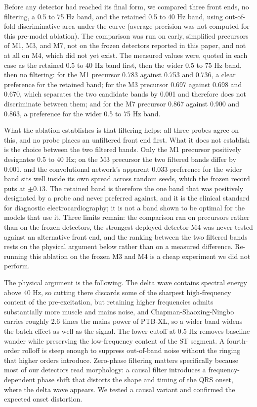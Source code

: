\documentclass[11pt]{article}
\begin{document}
Before any detector had reached its final form, we compared three front ends, no filtering, a 0.5 to 75 Hz band, and the retained 0.5 to 40 Hz band, using out-of-fold discriminative area under the curve (average precision was not computed for this pre-model ablation). The comparison was run on early, simplified precursors of M1, M3, and M7, not on the frozen detectors reported in this paper, and not at all on M4, which did not yet exist. The measured values were, quoted in each case as the retained 0.5 to 40 Hz band first, then the wider 0.5 to 75 Hz band, then no filtering: for the M1 precursor 0.783 against 0.753 and 0.736, a clear preference for the retained band; for the M3 precursor 0.697 against 0.698 and 0.670, which separates the two candidate bands by 0.001 and therefore does not discriminate between them; and for the M7 precursor 0.867 against 0.900 and 0.863, a preference for the wider 0.5 to 75 Hz band.

What the ablation establishes is that filtering helps: all three probes agree on this, and no probe places an unfiltered front end first. What it does not establish is the choice between the two filtered bands. Only the M1 precursor positively designates 0.5 to 40 Hz; on the M3 precursor the two filtered bands differ by 0.001, and the convolutional network's apparent 0.033 preference for the wider band sits well inside its own spread across random seeds, which the frozen record puts at $\pm 0.13$. The retained band is therefore the one band that was positively designated by a probe and never preferred against, and it is the clinical standard for diagnostic electrocardiography; it is not a band shown to be optimal for the models that use it. Three limits remain: the comparison ran on precursors rather than on the frozen detectors, the strongest deployed detector M4 was never tested against an alternative front end, and the ranking between the two filtered bands rests on the physical argument below rather than on a measured difference. Re-running this ablation on the frozen M3 and M4 is a cheap experiment we did not perform.

The physical argument is the following. The delta wave contains spectral energy above 40 Hz, so cutting there discards some of the sharpest high-frequency content of the pre-excitation, but retaining higher frequencies admits substantially more muscle and mains noise, and Chapman-Shaoxing-Ningbo carries roughly 2.6 times the mains power of PTB-XL, so a wider band widens the batch effect as well as the signal. The lower cutoff at 0.5 Hz removes baseline wander while preserving the low-frequency content of the ST segment. A fourth-order rolloff is steep enough to suppress out-of-band noise without the ringing that higher orders introduce. Zero-phase filtering matters specifically because most of our detectors read morphology: a causal filter introduces a frequency-dependent phase shift that distorts the shape and timing of the QRS onset, where the delta wave appears. We tested a causal variant and confirmed the expected onset distortion.
\end{document}
